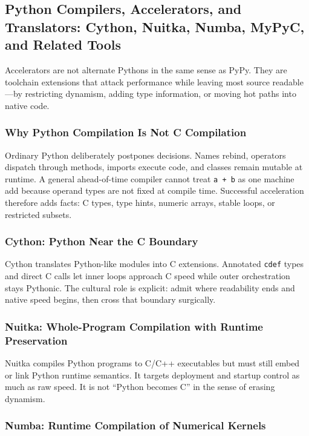 \subsection{Python Compilers, Accelerators, and Translators: Cython, Nuitka, Numba, MyPyC, and Related Tools}

Accelerators are not alternate Pythons in the same sense as PyPy. They are toolchain extensions that attack performance while leaving most source readable---by restricting dynamism, adding type information, or moving hot paths into native code.

\subsubsection{Why Python Compilation Is Not C Compilation}

Ordinary Python deliberately postpones decisions. Names rebind, operators dispatch through methods, imports execute code, and classes remain mutable at runtime. A general ahead-of-time compiler cannot treat \texttt{a + b} as one machine add because operand types are not fixed at compile time. Successful acceleration therefore adds facts: C types, type hints, numeric arrays, stable loops, or restricted subsets.

\subsubsection{Cython: Python Near the C Boundary}

Cython translates Python-like modules into C extensions. Annotated \texttt{cdef} types and direct C calls let inner loops approach C speed while outer orchestration stays Pythonic. The cultural role is explicit: admit where readability ends and native speed begins, then cross that boundary surgically.

\subsubsection{Nuitka: Whole-Program Compilation with Runtime Preservation}

Nuitka compiles Python programs to C/C++ executables but must still embed or link Python runtime semantics. It targets deployment and startup control as much as raw speed. It is not ``Python becomes C'' in the sense of erasing dynamism.

\subsubsection{Numba: Runtime Compilation of Numerical Kernels}

